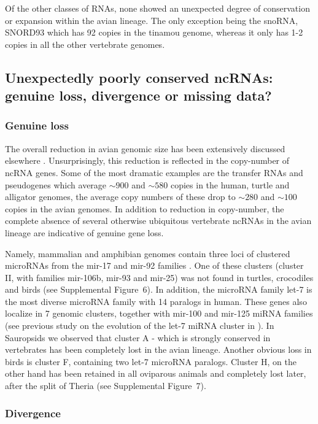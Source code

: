 \documentclass[10pt]{bmc_article}
\newenvironment{bmcformat}{\begin{raggedright}\baselineskip20pt\sloppy\setboolean{publ}{false}}{\end{raggedright}\baselineskip20pt\sloppy}
\begin{document}
\begin{bmcformat}
Of the other classes of RNAs, none showed an unexpected degree of
conservation or expansion within the avian lineage. The only exception
being the snoRNA, SNORD93 which has 92 copies in the tinamou
genome, whereas it only has 1-2 copies in all the other vertebrate
genomes. 

\subsection*{Unexpectedly poorly conserved  ncRNAs: genuine loss, divergence or missing  data?}

\subsubsection*{Genuine loss}

The overall reduction in avian genomic size has been extensively
discussed elsewhere \cite{Organ:2007}. Unsurprisingly, this reduction
is reflected in the copy-number of ncRNA genes. Some of the most
dramatic examples are the transfer RNAs and pseudogenes which average
$\sim900$ and $\sim580$ copies in the human, turtle and alligator
genomes, the average copy numbers of these drop to $\sim280$ and
$\sim100$ copies in the avian genomes. In addition to reduction in
copy-number, the complete absence of several otherwise ubiquitous
vertebrate ncRNAs in the avian lineage are indicative of genuine gene
loss. 

Namely, mammalian and amphibian genomes contain three loci of
clustered microRNAs from the mir-17 and mir-92 families
\cite{Tanzer:04}. One of these clusters (cluster II, with families
mir-106b, mir-93 and mir-25) was not found in turtles, crocodiles and
birds (see Supplemental Figure~6). In addition, the microRNA family
let-7 is the most diverse microRNA family with 14 paralogs in
human. These genes also localize in 7 genomic clusters, together with
mir-100 and mir-125 miRNA families (see previous study on the
evolution of the let-7 miRNA cluster in \cite{Hertel:2012}). In Sauropsids we
observed that cluster A - which is strongly conserved in vertebrates
has been completely lost in the avian lineage.  Another obvious loss
in birds is cluster F, containing two let-7 microRNA paralogs. Cluster
H, on the other hand has been retained in all oviparous animals and
completely lost later, after the split of Theria (see Supplemental
Figure~7).

\subsubsection*{Divergence}


\end{bmcformat}
\end{document}
